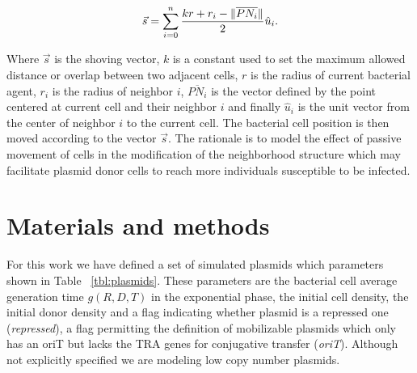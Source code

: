 \begin{equation}
\label{eq:shoving}
\centering 
\vec{s}= \displaystyle\sum\limits_{i=0}^n \frac{kr + r_i - \Vert \overline{PN_i} \Vert}{2} \hat{u}_i.
\end{equation}

Where $\vec{s}$ is the shoving vector, $k$ is a constant used to set the maximum allowed distance or overlap between two adjacent cells, $r$ is the radius of current bacterial agent, $r_i$ is the radius of neighbor $i$, $\overline{PN_i}$ is the vector defined by the point centered at current cell and their neighbor $ i$ and finally $\hat{u}_i$ is the unit vector from the center of neighbor $i$ to the current cell. The bacterial cell position is then moved according to the vector $\vec {s}$. The rationale is to model the effect of passive movement of cells in the modification of the neighborhood structure which may facilitate plasmid donor cells to reach more individuals susceptible to be infected.

\section{Materials and methods}

For this work we have defined a set of simulated plasmids which parameters shown in Table ~\ref{tbl:plasmids}. These parameters are the bacterial cell average generation time $g(R,D,T)$ in the exponential phase, the initial cell density, the initial donor density and  a flag indicating whether plasmid is a repressed one ({\it repressed}), a flag permitting the definition of mobilizable plasmids which only has an oriT but lacks the TRA genes for conjugative transfer ({\it oriT}). Although not explicitly specified we are modeling low copy number plasmids. 

